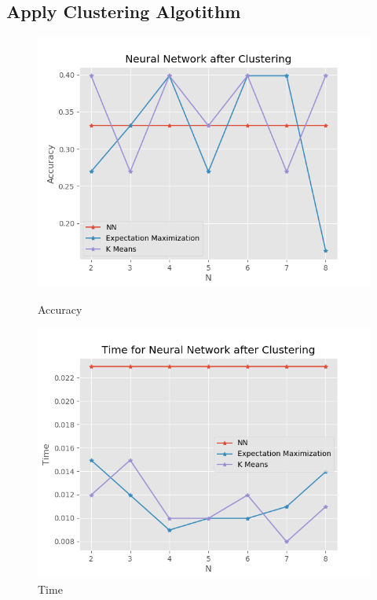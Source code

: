 \documentclass[11pt]{article}
\begin{document}
\subsection{Apply Clustering Algotithm}
\begin{figure}[!htb]
   \begin{minipage}{0.5\textwidth}
     \centering
     \includegraphics[width=1.2\linewidth]{../figures/wine_nn_cluster.png}
     \caption{Accuracy}\label{Fig:wine_nn_cluster}
   \end{minipage}\hfill
   \begin{minipage}{0.5\textwidth}
     \centering
     \includegraphics[width=1.2\linewidth]{../figures/wine_nn_cluster_time.png}
     \caption{Time}\label{Fig:wine_nn_cluster_time}
   \end{minipage}
\end{figure}
\end{document}
